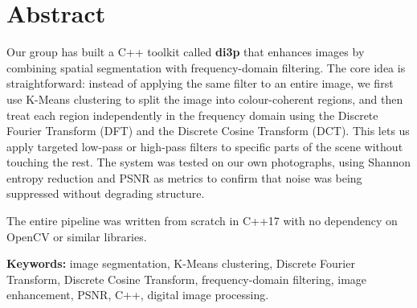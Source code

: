 \chapter*{Abstract}

Our group has built a C++ toolkit called \textbf{di3p} that enhances images by combining spatial
segmentation with frequency-domain filtering. The core idea is straightforward: instead
of applying the same filter to an entire image, we first use K-Means clustering to split
the image into colour-coherent regions, and then treat each region independently in the
frequency domain using the Discrete Fourier Transform (DFT) and the Discrete Cosine
Transform (DCT). This lets us apply targeted low-pass or high-pass filters to specific
parts of the scene without touching the rest. The system was tested on our own photographs, using Shannon entropy
reduction and PSNR as metrics to confirm that noise was being suppressed
without degrading structure. 

\vspace{0.5cm}
\noindent The entire pipeline was written from scratch in
C++17 with no dependency on OpenCV or similar libraries.

\vspace{0.5cm}
\noindent\textbf{Keywords:} image segmentation, K-Means clustering, Discrete Fourier
Transform, Discrete Cosine Transform, frequency-domain filtering, image enhancement,
PSNR, C++, digital image processing.
